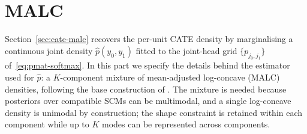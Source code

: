 \documentclass[11pt]{article}
\begin{document}


\section{MALC}
\label{app:malc}

Section~\ref{sec:cate-malc} recovers the per-unit CATE density by
marginalising a continuous joint density $\hat p(y_{0}, y_{1})$ fitted
to the joint-head grid $\{p_{j_{0}, j_{1}}\}$
of~\eqref{eq:pmat-softmax}. In this part we specify the details behind the estimator
used for $\hat p$: a $K$-component mixture of mean-adjusted log-concave
(MALC) densities, following the base construction of
\citet{danisman2026malc}. The mixture is needed because posteriors
over compatible SCMs can be multimodal, and a single
log-concave density is unimodal by construction; the shape constraint
is retained within each component while up to $K$ modes can be
represented across components.
\end{document}
